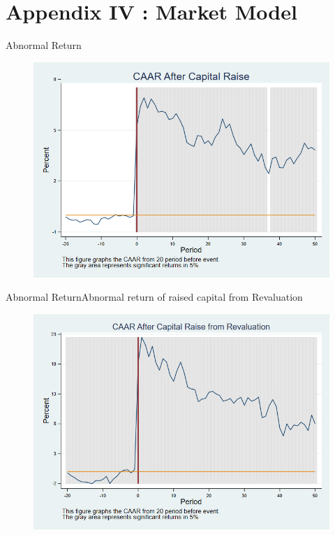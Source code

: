 \documentclass{beamer}
\begin{document}
	
	
	
	\section{Appendix IV : Market Model }
	
	
	\begin{frame}{Abnormal Return}
		\label{car_marketmodel}
		\begin{figure}
			\centering
			\includegraphics[width=0.7\linewidth]{Output/car_marketmodel.png}
			\label{fig:car_marketmodel}
		\end{figure}
	\end{frame}
	
	\begin{frame}{Abnormal Return}{Abnormal return of raised capital from Revaluation}
		\label{car_marketmodelRevaluation}
		\begin{figure}
			\centering
			\includegraphics[width=0.65\linewidth]{Output/car_marketmodelRevaluation.png}
			\label{fig:car_marketmodelRevaluation}
		\end{figure}
	\end{frame}
	
\end{document}
